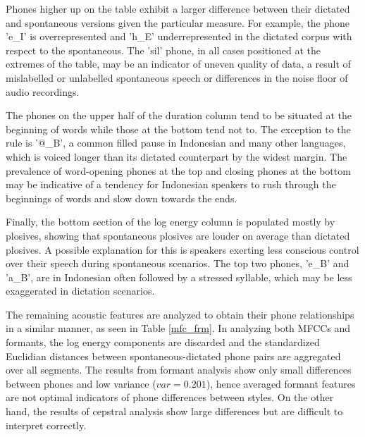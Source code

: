 \documentclass[conference]{IEEEtran}
\begin{document}
Phones higher up on the table exhibit a larger difference between their dictated and spontaneous versions given the particular measure.
For example, the phone 'e\_I' is overrepresented and 'h\_E' underrepresented in the dictated corpus with respect to the spontaneous.
The 'sil' phone, in all cases positioned at the extremes of the table, may be an indicator of uneven quality of data, a result of mislabelled or unlabelled spontaneous speech or differences in the noise floor of audio recordings.

The phones on the upper half of the duration column tend to be situated at the beginning of words while those at the bottom tend not to.
The exception to the rule is '@\_B', a common filled pause in Indonesian and many other languages, which is voiced longer than its dictated counterpart by the widest margin.
The prevalence of word-opening phones at the top and closing phones at the bottom may be indicative of a tendency for Indonesian speakers to rush through the beginnings of words and slow down towards the ends.

Finally, the bottom section of the log energy column is populated mostly by plosives, showing that spontaneous plosives are louder on average than dictated plosives.
A possible explanation for this is speakers exerting less conscious control over their speech during spontaneous scenarios.
The top two phones, 'e\_B' and 'a\_B', are in Indonesian often followed by a stressed syllable, which may be less exaggerated in dictation scenarios.


The remaining acoustic features are analyzed to obtain their phone relationships in a similar manner, as seen in Table \ref{mfc_frm}.
In analyzing both MFCCs and formants, the log energy components are discarded and the standardized Euclidian distances between spontaneous-dictated phone pairs are aggregated over all segments.
The results from formant analysis show only small differences between phones and low variance ($var = 0.201$), hence averaged formant features are not optimal indicators of phone differences between styles.
On the other hand, the results of cepstral analysis show large differences but are difficult to interpret correctly.
\end{document}
